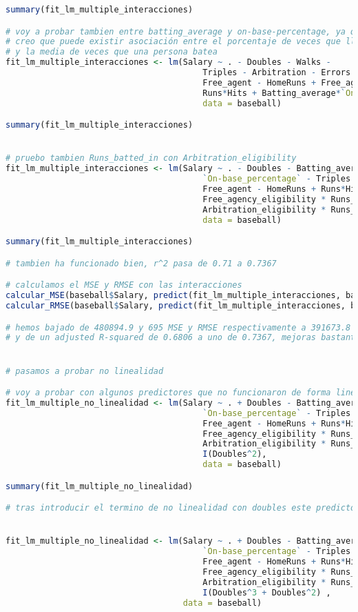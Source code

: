 \begin{lstlisting}[language=R]
summary(fit_lm_multiple_interacciones)

# voy a probar tambien entre batting_average y on-base-percentage, ya que
# creo que puede existir asociación entre el porcentaje de veces que llega a una base
# y la media de veces que una persona batea
fit_lm_multiple_interacciones <- lm(Salary ~ . - Doubles - Walks -
										Triples - Arbitration - Errors -
										Free_agent - HomeRuns + Free_agency_eligibility*Runs_batted_in +
										Runs*Hits + Batting_average*`On-base_percentage`,
										data = baseball)

summary(fit_lm_multiple_interacciones)


# pruebo tambien Runs_batted_in con Arbitration_eligibility
fit_lm_multiple_interacciones <- lm(Salary ~ . - Doubles - Batting_average - Walks -
										`On-base_percentage` - Triples - Arbitration - Errors -
										Free_agent - HomeRuns + Runs*Hits +
										Free_agency_eligibility * Runs_batted_in +
										Arbitration_eligibility * Runs_batted_in,
										data = baseball)

summary(fit_lm_multiple_interacciones)

# tambien ha funcionado bien, r^2 pasa de 0.71 a 0.7367

# calculamos el MSE y RMSE con las interacciones
calcular_MSE(baseball$Salary, predict(fit_lm_multiple_interacciones, baseball))
calcular_RMSE(baseball$Salary, predict(fit_lm_multiple_interacciones, baseball))

# hemos bajado de 480894.9 y 695 MSE y RMSE respectivamente a 391673.8 y 627.7039,
# y de un adjusted R-squared de 0.6806 a uno de 0.7367, mejoras bastante significativas


# pasamos a probar no linealidad

# voy a probar con algunos predictores que no funcionaron de forma lineal
fit_lm_multiple_no_linealidad <- lm(Salary ~ . + Doubles - Batting_average - Walks -
										`On-base_percentage` - Triples - Arbitration - Errors -
										Free_agent - HomeRuns + Runs*Hits +
										Free_agency_eligibility * Runs_batted_in +
										Arbitration_eligibility * Runs_batted_in +
										I(Doubles^2),
										data = baseball)

summary(fit_lm_multiple_no_linealidad)

# tras introducir el termino de no linealidad con doubles este predictor si ha pasado a tener importancia


fit_lm_multiple_no_linealidad <- lm(Salary ~ . + Doubles - Batting_average - Walks -
										`On-base_percentage` - Triples - Arbitration - Errors -
										Free_agent - HomeRuns + Runs*Hits +
										Free_agency_eligibility * Runs_batted_in +
										Arbitration_eligibility * Runs_batted_in +
										I(Doubles^3 + Doubles^2) ,
									data = baseball)


\end{lstlisting}

